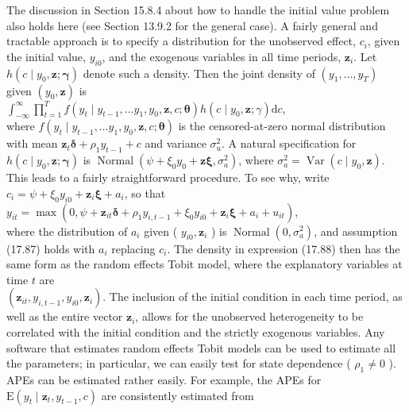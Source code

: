\documentclass[10pt]{article}
\begin{document}
The discussion in Section 15.8.4 about how to handle the initial value problem also holds here (see Section 13.9.2 for the general case). A fairly general and tractable approach is to specify a distribution for the unobserved effect, $c_{i}$, given the initial value, $y_{i 0}$, and the exogenous variables in all time periods, $\mathbf{z}_{i}$. Let $h\left(c \mid y_{0}, \mathbf{z} ; \boldsymbol{\gamma}\right)$ denote such a density. Then the joint density of $\left(y_{1}, \ldots, y_{T}\right)$ given $\left(y_{0}, \mathbf{z}\right)$ is\\
$\int_{-\infty}^{\infty} \prod_{t=1}^{T} f\left(y_{t} \mid y_{t-1}, \ldots y_{1}, y_{0}, \mathbf{z}, c ; \boldsymbol{\theta}\right) h\left(c \mid y_{0}, \mathbf{z} ; \gamma\right) \mathrm{d} c$,\\
where $f\left(y_{t} \mid y_{t-1}, \ldots y_{1}, y_{0}, \mathbf{z}, c ; \boldsymbol{\theta}\right)$ is the censored-at-zero normal distribution with mean $\mathbf{z}_{t} \boldsymbol{\delta}+\rho_{1} y_{t-1}+c$ and variance $\sigma_{u}^{2}$. A natural specification for $h\left(c \mid y_{0}, \mathbf{z} ; \boldsymbol{\gamma}\right)$ is $\operatorname{Normal}\left(\psi+\xi_{0} y_{0}+\mathbf{z} \boldsymbol{\xi}, \sigma_{a}^{2}\right)$, where $\sigma_{a}^{2}=\operatorname{Var}\left(c \mid y_{0}, \mathbf{z}\right)$. This leads to a fairly straightforward procedure. To see why, write $c_{i}=\psi+\xi_{0} y_{i 0}+\mathbf{z}_{i} \boldsymbol{\xi}+a_{i}$, so that\\
$y_{i t}=\max \left(0, \psi+\mathbf{z}_{i t} \boldsymbol{\delta}+\rho_{1} y_{i, t-1}+\xi_{0} y_{i 0}+\mathbf{z}_{i} \boldsymbol{\xi}+a_{i}+u_{i t}\right)$,\\
where the distribution of $a_{i}$ given ( $y_{i 0}, \mathbf{z}_{i}$ ) is $\operatorname{Normal}\left(0, \sigma_{a}^{2}\right)$, and assumption (17.87) holds with $a_{i}$ replacing $c_{i}$. The density in expression (17.88) then has the same form as the random effects Tobit model, where the explanatory variables at time $t$ are\\
$\left(\mathbf{z}_{i t}, y_{i, t-1}, y_{i 0}, \mathbf{z}_{i}\right)$. The inclusion of the initial condition in each time period, as well as the entire vector $\mathbf{z}_{i}$, allows for the unobserved heterogeneity to be correlated with the initial condition and the strictly exogenous variables. Any software that estimates random effects Tobit models can be used to estimate all the parameters; in particular, we can easily test for state dependence ( $\rho_{1} \neq 0$ ). APEs can be estimated rather easily. For example, the APEs for $\mathrm{E}\left(y_{t} \mid \mathbf{z}_{t}, y_{t-1}, c\right)$ are consistently estimated from
\end{document}
